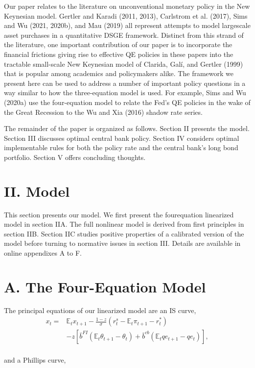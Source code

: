 \documentclass[10pt]{article}
\begin{document}
Our paper relates to the literature on unconventional monetary policy in the New Keynesian model. Gertler and Karadi (2011, 2013), Carlstrom et al. (2017), Sims and Wu (2021, 2020b), and Mau (2019) all represent attempts to model largescale asset purchases in a quantitative DSGE framework. Distinct from this strand of the literature, one important contribution of our paper is to incorporate the financial frictions giving rise to effective QE policies in these papers into the tractable small-scale New Keynesian model of Clarida, Galí, and Gertler (1999) that is popular among academics and policymakers alike. The framework we present here can be used to address a number of important policy questions in a way similar to how the three-equation model is used. For example, Sims and Wu (2020a) use the four-equation model to relate the Fed's QE policies in the wake of the Great Recession to the Wu and Xia (2016) shadow rate series.

The remainder of the paper is organized as follows. Section II presents the model. Section III discusses optimal central bank policy. Section IV considers optimal implementable rules for both the policy rate and the central bank's long bond portfolio. Section V offers concluding thoughts.

\section*{II. Model}
This section presents our model. We first present the fourequation linearized model in section IIA. The full nonlinear model is derived from first principles in section IIB. Section IIC studies positive properties of a calibrated version of the model before turning to normative issues in section III. Details are available in online appendixes A to F.

\section*{A. The Four-Equation Model}
The principal equations of our linearized model are an IS curve,\\
\begin{align*}
x_{t}= & \mathbb{E}_{t} x_{t+1}-\frac{1-z}{\sigma}\left(r_{t}^{s}-\mathbb{E}_{t} \pi_{t+1}-r_{t}^{*}\right) \\
& -z\left[\bar{b}^{F I}\left(\mathbb{E}_{t} \theta_{t+1}-\theta_{t}\right)+\bar{b}^{c b}\left(\mathbb{E}_{t} q e_{t+1}-q e_{t}\right)\right], \tag{1}
\end{align*}\\
and a Phillips curve,
\end{document}
